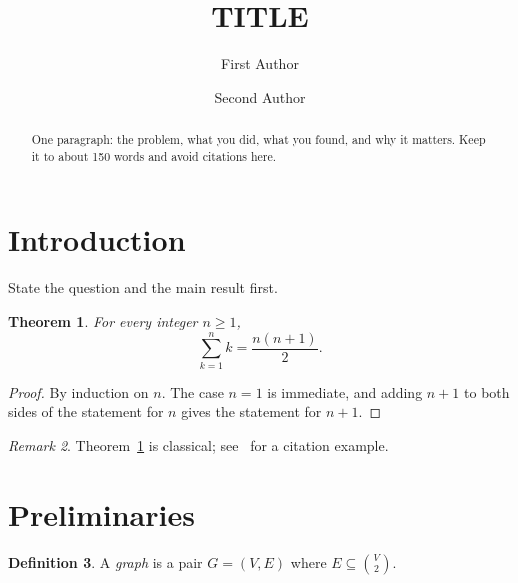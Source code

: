 \documentclass[11pt]{amsart}
\title{{{TITLE}}}
\author{First Author}
\author{Second Author}
\newtheorem{theorem}{Theorem}[section]
\theoremstyle{definition}
\newtheorem{definition}[theorem]{Definition}
\theoremstyle{remark}
\newtheorem{remark}[theorem]{Remark}
\begin{document}
\begin{abstract}
One paragraph: the problem, what you did, what you found, and why it matters. Keep it to about 150 words and avoid citations here.
\end{abstract}

\maketitle

\section{Introduction}

State the question and the main result first.

\begin{theorem}\label{thm:main}
For every integer $n \ge 1$,
\[
  \sum_{k=1}^{n} k = \frac{n(n+1)}{2}.
\]
\end{theorem}

\begin{proof}
By induction on $n$. The case $n = 1$ is immediate, and adding $n+1$ to both
sides of the statement for $n$ gives the statement for $n+1$.
\end{proof}

\begin{remark}
Theorem~\ref{thm:main} is classical; see~\cite{mcmahan2017communication} for a citation example.
\end{remark}

\section{Preliminaries}

\begin{definition}
A \emph{graph} is a pair $G = (V, E)$ where $E \subseteq \binom{V}{2}$.
\end{definition}



\end{document}
